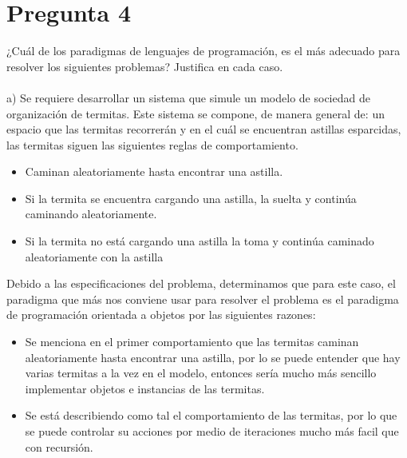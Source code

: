 \newpage
\section*{Pregunta 4}
\Large 
¿Cuál de los paradigmas de lenguajes de programación, es el más adecuado para resolver los siguientes problemas? Justifica en cada caso.\\\\
a) Se requiere desarrollar un sistema que simule un modelo de sociedad de organización de termitas. Este sistema se compone, de manera general de: un espacio que las termitas recorrerán y en el cuál se encuentran astillas esparcidas, las termitas siguen las siguientes reglas de comportamiento.\\
\begin{itemize}
\item Caminan aleatoriamente hasta encontrar una astilla.
\item Si la termita se encuentra cargando una astilla, la suelta y continúa caminando aleatoriamente.
\item Si la termita no está cargando una astilla la toma y continúa caminado aleatoriamente con la astilla
\end{itemize}
\large

Debido a las especificaciones del problema, determinamos que  para este caso, el paradigma que más nos conviene usar
para resolver el problema es el paradigma de programación orientada a objetos por las siguientes razones:

\begin{itemize}
    \item Se menciona en el primer comportamiento que las termitas caminan aleatoriamente hasta encontrar una astilla,
    por lo se puede entender que hay varias termitas a la vez en el modelo, entonces sería mucho más sencillo implementar
    objetos e instancias de las termitas.

    \item Se está describiendo como tal el comportamiento de las termitas, por lo que se puede controlar su acciones por
    medio de iteraciones mucho más facil que con recursión.
\end{itemize}

